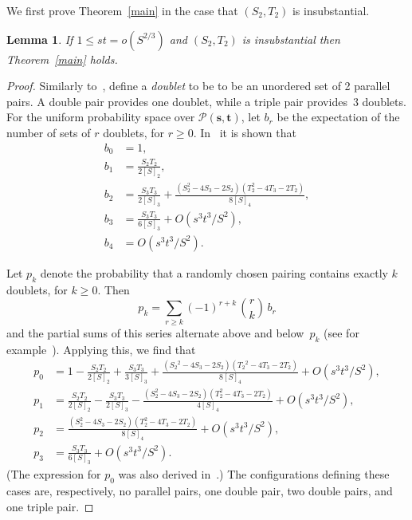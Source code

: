 \documentclass[12pt]{article}
\newtheorem{lemma}[theorem]{Lemma}
\numberwithin{equation}{section}
\def\P{{\mathcal{P}}}
\def\svec{{\boldsymbol{s}}}
\def\tvec{{\boldsymbol{t}}}
\def\Pst{{\P(\svec,\tvec)}}
\begin{document}
\bigskip

We first prove Theorem~\ref{main} in the case that $(S_2,T_2)$ is
insubstantial.

\begin{lemma}\label{easycases2}
If\/ $1\le st = o(S^{2/3})$ and $(S_2,T_2)$ is insubstantial
then Theorem~\ref{main} holds.  
\end{lemma}

\begin{proof}
Similarly to~\cite[Lemma 2.2]{GMW}, define a \textit{doublet\/}
to be to be an unordered set of 2 parallel pairs.
A double pair provides one doublet, while a triple pair
provides~3 doublets.
For the uniform probability space over $\Pst$, let $b_r$ be
the expectation of the number of sets of $r$ doublets,
for $r\ge 0$.
In~\cite[Lemma 2.2]{GMW} it is shown that
\begin{align*}
b_0 &= 1,\\
b_1 &= \frac{S_2T_2}{2[S]_2},\\
b_2 &= \frac{S_3T_3}{2[S]_3} + 
   \frac{(S_2^2 - 4S_3 - 2S_2)(T_2^2 - 4T_3 - 2T_2)}{8[S]_4},\\
b_3 &= \frac{S_3T_3}{6[S]_3} + O(s^3t^3/S^2),\\
b_4 &= O(s^3t^3/S^2).
\end{align*}

Let $p_k$ denote the probability that a randomly chosen pairing
contains exactly $k$ doublets, for $k\geq 0$.  
Then
\[ p_k = \sum_{r\geq k} (-1)^{r+k}\, \binom{r}{k}\, b_r\]
and the partial sums of 
this series alternate above and below~$p_k$
(see for example~\cite[Theorem 1.10]{bollobas}).
Applying this, we find that
\begin{align*}
p_0 &= 1 - \frac{S_2T_2}{2[S]_2} + \frac{S_3T_3}{3[S]_3}
  + \frac{({S_2}^2 - 4S_3 - 2S_2)({T_2}^2 - 4T_3 - 2T_2)}{8[S]_4}
   + O(s^3t^3/S^2),\\
p_1 &=  \frac{S_2T_2}{2[S]_2} - \frac{S_3T_3}{2[S]_3} 
  - \frac{(S_2^2 - 4S_3 - 2S_2)(T_2^2 - 4T_3 - 2T_2)}{4[S]_4} 
   + O(s^3t^3/S^2),\\
p_2 &=  \frac{(S_2^2 - 4S_3 - 2S_2)(T_2^2 - 4T_3 - 2T_2)}{8[S]_4} 
                   + O(s^3t^3/S^2),\\
p_3 &=  \frac{S_3T_3}{6[S]_3} + O(s^3t^3/S^2).
\end{align*}
(The expression for $p_0$ was also derived in~\cite[Lemma 2.2]{GMW}.)
The configurations defining these cases are, respectively,
no parallel pairs, one double pair, two double pairs, and one
triple pair. 


\end{proof}
\end{document}
